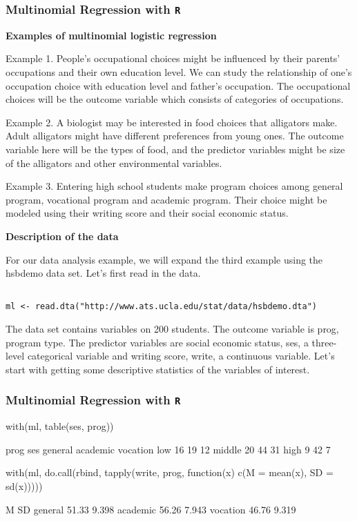 \documentclass[00-GLMregslides.tex]{subfiles}
\begin{document}
\begin{frame}[fragile]

\frametitle{Multinomial Regression with \texttt{R}}
\Large
\textbf{Examples of multinomial logistic regression}

Example 1. People's occupational choices might be influenced by their parents' occupations and their own education level. We can study the relationship of one's occupation choice with education level and father's occupation. The occupational choices will be the outcome variable which consists of categories of occupations. 

Example 2. A biologist may be interested in food choices that alligators make. Adult alligators might have different preferences from young ones. The outcome variable here will be the types of food, and the predictor variables might be size of the alligators and other environmental variables.
 
Example 3. Entering high school students make program choices among general program, vocational program and academic program. Their choice might be modeled using their writing score and their social economic status.

\end{frame}
\begin{frame}[fragile]

\textbf{Description of the data}
 
For our data analysis example, we will expand the third example using the hsbdemo data set. Let's first read in the data.
 
\begin{verbatim}

ml <- read.dta("http://www.ats.ucla.edu/stat/data/hsbdemo.dta")
\end{verbatim}
 
The data set contains variables on 200 students. The outcome variable is prog, program type. The predictor variables are social economic status, ses, a three-level categorical variable and writing score, write, a continuous variable. Let's start with getting some descriptive statistics of the variables of interest.
\end{frame} 
\begin{frame}[fragile]

\frametitle{Multinomial Regression with \texttt{R}}
\Large


with(ml, table(ses, prog))
 
         prog
 ses      general academic vocation
   low         16       19       12
   middle      20       44       31
   high         9       42        7
 
with(ml, do.call(rbind, tapply(write, prog, function(x) c(M = mean(x), SD = sd(x)))))
 
              M    SD
 general  51.33 9.398
 academic 56.26 7.943
 vocation 46.76 9.319
 

\end{frame}
\end{document}
